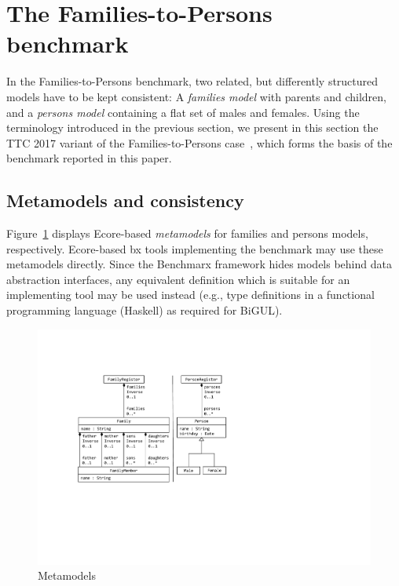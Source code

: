 

\section{The Families-to-Persons benchmark}
\label{sec:FamiliesToPersons}



In the Families-to-Persons benchmark, two related, but differently structured models have to be kept consistent: A \emph{families model} with parents and children, and a \emph{persons model} containing a flat set of males and females. 
Using the terminology introduced in the previous section, we present in this section the TTC 2017 variant of the Families-to-Persons case~\cite{Anjorin2017a,ENASE2018-Westfechtel}, which forms the basis of the benchmark reported in this paper. 

\subsection{Metamodels and consistency}
\label{sec:MetamodelsAndConsistency}

Figure~\ref{fig:metamodels} displays Ecore-based \emph{metamodels} for families and persons models, respectively. Ecore-based bx tools implementing the benchmark may use these metamodels directly. Since the Benchmarx framework hides models behind data abstraction interfaces, any equivalent definition which is suitable for an implementing tool may be used instead (e.g., type definitions in a functional programming language (Haskell) as required for BiGUL).



\begin{figure}[tb!]
	\centering
	\includegraphics[width=\columnwidth]{diagrams/Metamodels}
	\caption{Metamodels}
	\label{fig:metamodels}
\end{figure}

